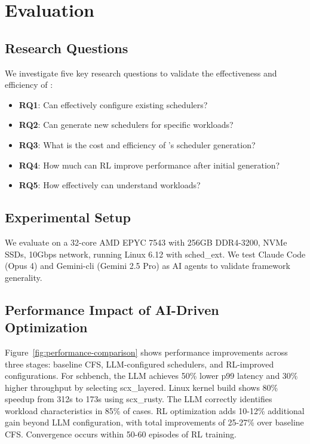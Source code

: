 \section{Evaluation}
\label{sec:evaluation}

\subsection{Research Questions}

We investigate five key research questions to validate the effectiveness and efficiency of \sys:

\begin{itemize}
\item \textbf{RQ1}: Can \sys effectively configure existing schedulers?
\item \textbf{RQ2}: Can \sys generate new schedulers for specific workloads?
\item \textbf{RQ3}: What is the cost and efficiency of \sys's scheduler generation?
\item \textbf{RQ4}: How much can RL improve performance after initial generation?
\item \textbf{RQ5}: How effectively can \sys understand workloads?
\end{itemize}

\subsection{Experimental Setup}

We evaluate \sys on a 32-core AMD EPYC 7543 with 256GB DDR4-3200, NVMe SSDs, 10Gbps network, running Linux 6.12 with sched\_ext. We test Claude Code (Opus 4) and Gemini-cli (Gemini 2.5 Pro) as AI agents to validate framework generality.

\subsection{Performance Impact of AI-Driven Optimization}

Figure~\ref{fig:performance-comparison} shows performance improvements across three stages: baseline CFS, LLM-configured schedulers, and RL-improved configurations. For schbench, the LLM achieves 50\% lower p99 latency and 30\% higher throughput by selecting scx\_layered. Linux kernel build shows 80\% speedup from 312s to 173s using scx\_rusty. The LLM correctly identifies workload characteristics in 85\% of cases. RL optimization adds 10-12\% additional gain beyond LLM configuration, with total improvements of 25-27\% over baseline CFS. Convergence occurs within 50-60 episodes of RL training.

